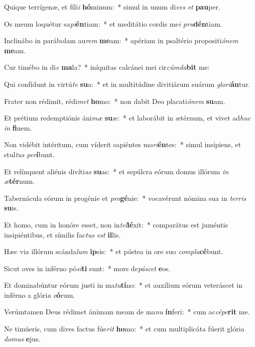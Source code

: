 \item Quique terrígenæ, et fíli\textit{i} \textbf{hó}minum:~* simul in unum di\textit{ves} \textit{et} \textbf{pau}per.
\item Os meum loquétur sa\textit{pi}\textbf{én}tiam:~* et meditátio cordis me\textit{i} \textit{pru}\textbf{dén}tiam.
\item Inclinábo in parábolam au\textit{rem} \textbf{me}am:~* apériam in psaltério propositi\textit{ó}\textit{nem} \textbf{me}am.
\item Cur timébo in di\textit{e} \textbf{ma}la?~* iníquitas calcánei mei cir\textit{cúm}\textit{da}\textbf{bit} me:
\item Qui confídunt in virtú\textit{te} \textbf{su}a:~* et in multitúdine divitiárum suárum \textit{glo}\textit{ri}\textbf{án}tur.
\item Frater non rédimit, rédi\textit{met} \textbf{ho}mo:~* non dabit Deo placati\textit{ó}\textit{nem} \textbf{su}am.
\item Et prétium redemptiónis áni\textit{mæ} \textbf{su}æ:~* et laborábit in ætérnum, et vivet ad\textit{huc} \textit{in} \textbf{fi}nem.
\item Non vidébit intéritum, cum víderit sapiéntes mo\textit{ri}\textbf{én}tes:~* simul insípiens, et stul\textit{tus} \textit{per}\textbf{í}bunt.
\item Et relínquent aliénis divíti\textit{as} \textbf{su}as:~* et sepúlcra eórum domus illórum \textit{in} \textit{æ}\textbf{tér}num.
\item Tabernácula eórum in progénie et \textit{pro}\textbf{gé}nie:~* vocavérunt nómina sua in \textit{ter}\textit{ris} \textbf{su}is.
\item Et homo, cum in honóre esset, non in\textit{tel}\textbf{lé}xit:~* comparátus est juméntis insipiéntibus, et símilis fac\textit{tus} \textit{est} \textbf{il}lis.
\item Hæc via illórum scánda\textit{lum} \textbf{ip}sis:~* et póstea in ore suo \textit{com}\textit{pla}\textbf{cé}bunt.
\item Sicut oves in inférno pó\textit{si}\textbf{ti} sunt:~* mors de\textit{pá}\textit{scet} \textbf{e}os.
\item Et dominabúntur eórum justi in ma\textit{tu}\textbf{tí}no:~* et auxílium eórum veteráscet in inférno a glóri\textit{a} \textit{e}\textbf{ó}rum.
\item Verúmtamen Deus rédimet ánimam meam de ma\textit{nu} \textbf{ín}feri:~* cum ac\textit{cé}\textit{pe}\textbf{rit} me.
\item Ne timúeris, cum dives factus fúe\textit{rit} \textbf{ho}mo:~* et cum multiplicáta fúerit glória \textit{do}\textit{mus} \textbf{e}jus.
